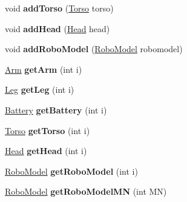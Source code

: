 \begin{DoxyCompactItemize}
\item 
void {\bfseries add\+Torso} (\hyperlink{classTorso}{Torso} torso)\hypertarget{classStorage_a6797a3aa49125e4133af5284c1ae7315}{}\label{classStorage_a6797a3aa49125e4133af5284c1ae7315}

\item 
void {\bfseries add\+Head} (\hyperlink{classHead}{Head} head)\hypertarget{classStorage_aad4f01da22440a1e4472649bd3410473}{}\label{classStorage_aad4f01da22440a1e4472649bd3410473}

\item 
void {\bfseries add\+Robo\+Model} (\hyperlink{classRoboModel}{Robo\+Model} robomodel)\hypertarget{classStorage_aba2478816770d9b44e57dd2210bd1232}{}\label{classStorage_aba2478816770d9b44e57dd2210bd1232}

\item 
\hyperlink{classArm}{Arm} {\bfseries get\+Arm} (int i)\hypertarget{classStorage_af7c67e2156184241802eea35e0faf726}{}\label{classStorage_af7c67e2156184241802eea35e0faf726}

\item 
\hyperlink{classLeg}{Leg} {\bfseries get\+Leg} (int i)\hypertarget{classStorage_a8c811cbf0e975306f6a70118c280c5c8}{}\label{classStorage_a8c811cbf0e975306f6a70118c280c5c8}

\item 
\hyperlink{classBattery}{Battery} {\bfseries get\+Battery} (int i)\hypertarget{classStorage_ac14fa06276224827851e6a5bc2247034}{}\label{classStorage_ac14fa06276224827851e6a5bc2247034}

\item 
\hyperlink{classTorso}{Torso} {\bfseries get\+Torso} (int i)\hypertarget{classStorage_afdd1f233c1363a246ec1b079e36a11db}{}\label{classStorage_afdd1f233c1363a246ec1b079e36a11db}

\item 
\hyperlink{classHead}{Head} {\bfseries get\+Head} (int i)\hypertarget{classStorage_a919efcd2adbafdbc1978bbc85a2bcd91}{}\label{classStorage_a919efcd2adbafdbc1978bbc85a2bcd91}

\item 
\hyperlink{classRoboModel}{Robo\+Model} {\bfseries get\+Robo\+Model} (int i)\hypertarget{classStorage_a4c7bebbe5822eb795159ec1b440d4d3d}{}\label{classStorage_a4c7bebbe5822eb795159ec1b440d4d3d}

\item 
\hyperlink{classRoboModel}{Robo\+Model} {\bfseries get\+Robo\+Model\+MN} (int MN)\hypertarget{classStorage_a6c32f458b401a83a706b95dea8d7ea15}{}\label{classStorage_a6c32f458b401a83a706b95dea8d7ea15}


\end{DoxyCompactItemize}
